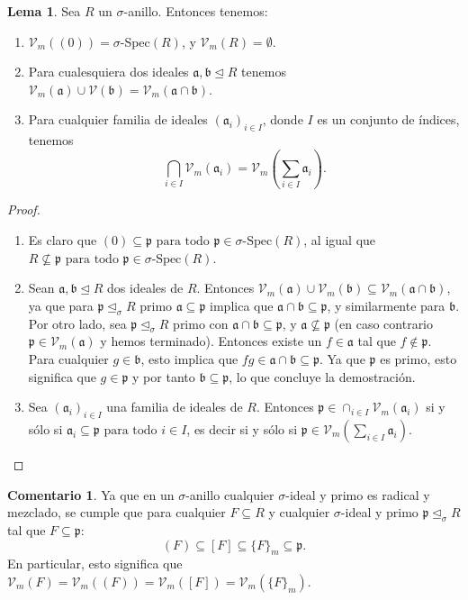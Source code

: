 \documentclass[letterpaper]{article}
\def\sSpec{\sigma\text{-Spec}}
\def\Vm{\mathcal{V}_m}
\def\V{\mathcal{V}}
\def\fa{\text{ para todo }}
\def\a{\mathfrak{a}}
\def\b{\mathfrak{b}}
\def\p{\mathfrak{p}}
\def\s{\sigma}
\def\si{\unlhd_{\sigma}}
\theoremstyle{definition}
\newtheorem{rem}[Satz]{Comentario}
\newtheorem{lem}[Satz]{Lema}
\begin{document}
\begin{lem}\label{topologywelldef}
Sea $R$ un $\sigma$-anillo. Entonces tenemos:
\begin{enumerate}
\item $\Vm((0)) = \s$-Spec$(R)$, y $\Vm(R) = \emptyset$.
\item Para cualesquiera dos ideales $\a,\b \unlhd R$ tenemos $\Vm(\a) \cup \V(\b) = \Vm(\a \cap \b)$.
\item Para cualquier familia de ideales $(\a_i)_{i \in I}$, donde $I$ es un conjunto de \'indices, tenemos $$\bigcap_{i \in I} \Vm(\a_i) = \Vm \left(\sum_{i \in I} \a_i \right).$$
\end{enumerate}
\end{lem}
\begin{proof} $\phantom{}$
\begin{enumerate}
\item Es claro que $(0) \subseteq \p \fa \p \in \sSpec(R)$, al igual que $R \not\subseteq \p \fa \p \in \sSpec(R)$.
\item Sean $\a, \b \unlhd R$ dos ideales de $R$. Entonces $\Vm(\a) \cup \Vm(\b) \subseteq \Vm(\a \cap \b)$, ya que para $\p \si R$ primo $\a \subseteq \p$ implica que $\a \cap \b \subseteq \p$, y similarmente para $\b$.
Por otro lado, sea $\p \si R$ primo con $\a \cap \b \subseteq \p$, y $\a \not\subseteq \p$ (en caso contrario $\p \in \Vm(\a)$ y hemos terminado). Entonces existe un $f \in \a$ tal que $f \notin \p$. 
Para cualquier $g \in \b$, esto implica que $fg \in \a \cap \b \subseteq \p$. Ya que $\p$ es primo, esto significa que $g \in \p$ y por tanto $\b \subseteq \p$, lo que concluye la demostraci\'on.
\item Sea $(\a_i)_{i \in I}$ una familia de ideales de $R$. Entonces $\p \in \cap_{i \in I} \Vm(\a_i)$ si y s\'olo si $\a_i \subseteq \p \fa i \in I$, es decir si y s\'olo si $\p \in \Vm(\sum_{i \in I} \a_i)$.
\end{enumerate}
\end{proof}


\begin{rem}\label{vmsequal}
Ya que en un $\sigma$-anillo cualquier $\sigma$-ideal y primo es radical y mezclado, se cumple que para cualquier $F \subseteq R$ y cualquier $\sigma$-ideal y primo $\p \si R$ tal que $F \subseteq \p$:
$$(F) \subseteq [F] \subseteq \{ F \}_m \subseteq \p.$$ En particular, esto significa que $\Vm(F) = \Vm((F)) = \Vm([F]) = \Vm(\{F\}_m)$.
\end{rem}
\end{document}
